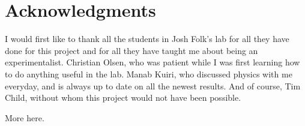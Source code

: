 
\chapter{Acknowledgments}

I would first like to thank all the students in Josh Folk's lab for all they have done for this project and for all they have taught me about being an experimentalist. Christian Olsen, who was patient while I was first learning how to do anything useful in the lab. Manab Kuiri, who discussed physics with me everyday, and is always up to date on all the newest results. And of course, Tim Child, without whom this project would not have been possible.

More here.